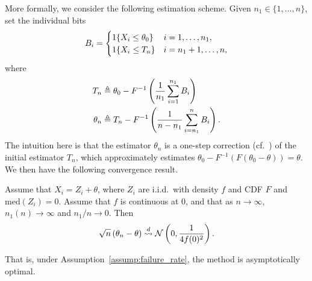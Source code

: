 More formally, we consider the following estimation scheme. Given
$n_1 \in \{1, \ldots, n\}$,
set the individual bits
\begin{equation*}
  B_i =
  \begin{cases}
    1\!\left\{X_i \le \theta_0\right\} & i = 1,\ldots,n_1, \\
    1\!\left\{X_i \le T_n\right\}& i={n_1+1,\ldots,n},
  \end{cases}
\end{equation*}
where
\begin{align*}
  T_n & \triangleq \theta_0 - F^{-1}\left(
  \frac{1}{n_1} \sum_{i=1}^{n_1} B_i 
  \right)\\
  \theta_n & \triangleq
  T_n - F^{-1} \left(\frac{1}{n - n_1}
  \sum_{i = n_1}^n B_i \right).
\end{align*} 
The intuition here is that the estimator $\theta_n$ is a one-step
correction (cf.~\cite[Thm.~6.4.3]{LehmannCa98}) of the initial estimator
$T_n$, which approximately estimates
$\theta_0 - F^{-1}\left(F(\theta_0 - \theta)\right) = \theta$. We then have the
following convergence result.
\begin{thm}
  Assume that $X_i = Z_i + \theta$, where $Z_i$ are i.i.d.\
  with density $f$ and CDF $F$ and $\mbox{med}(Z_i) = 0$. Assume that
  $f$ is continuous at 0, and that as $n \to \infty$,
  $n_1(n) \rightarrow \infty$ and $n_1 / n \to
  0$. Then
  \begin{align*}
    \sqrt{n} \left( {\theta}_n - \theta  \right)
    \stackrel{d}{\rightsquigarrow}  \mathcal{N}\left( 0, \frac{1}{4 f(0)^2}\right).
  \end{align*}
\end{thm}
\noindent
That is, under Assumption~\ref{assump:failure_rate}, the method is
asymptotically optimal.
%
